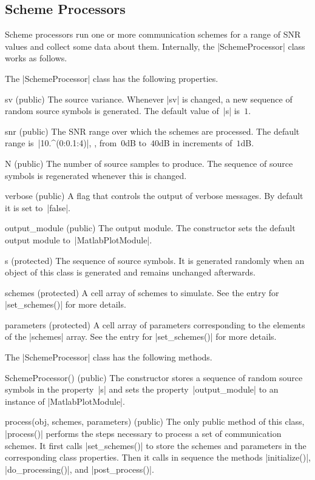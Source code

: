 \subsection{Scheme Processors}

Scheme processors run one or more communication schemes for a range of SNR
values and collect some data about them. Internally, the |SchemeProcessor| class
works as follows.

The |SchemeProcessor| class has the following properties.
\begin{property}{sv (public)}
The source variance. Whenever |sv| is changed, a new sequence of
  random source symbols is generated. The default value of~|s| is~$1$.
\end{property}
\begin{property}{snr (public)}
The SNR range over which the schemes are processed. The default range
is~|10.^(0:0.1:4)|, \ie, from~$0$dB to~$40$dB in increments of~$1$dB.
\end{property}
\begin{property}{N (public)}
The number of source samples to produce. The sequence of source symbols is
regenerated whenever this is changed. 
\end{property}
\begin{property}{verbose (public)}
A flag that controls the output of verbose messages. By default it is set
to~|false|.
\end{property}
\begin{property}{output_module (public)}
The output module. The constructor sets the default output module
to~|MatlabPlotModule|.
\end{property}
\begin{property}{s (protected)}
The sequence of source symbols. It is generated randomly when an object of this
class is generated and remains unchanged afterwards. 
\end{property}
\begin{property}{schemes (protected)}
A cell array of schemes to simulate. See the entry for |set_schemes()| for more
details. 
\end{property}
\begin{property}{parameters (protected)}
A cell array of parameters corresponding to the elements of the |schemes| array.
See the entry for |set_schemes()| for more details.
\end{property}

The |SchemeProcessor| class has the following methods.
\begin{method}{SchemeProcessor() (public)}
  The constructor stores a sequence of random source
  symbols in the property~|s| and sets the property~|output_module| to an instance of
  |MatlabPlotModule|. 
\end{method}
\begin{method}{process(obj, schemes, parameters) (public)}
  The only public method of this class,
  |process()| performs the steps necessary to process a set of communication
  schemes. It first calls |set_schemes()| to store the schemes and parameters
  in the corresponding class properties. Then it calls in sequence the
  methods |initialize()|, |do_processing()|, and |post_process()|.
\end{method}

